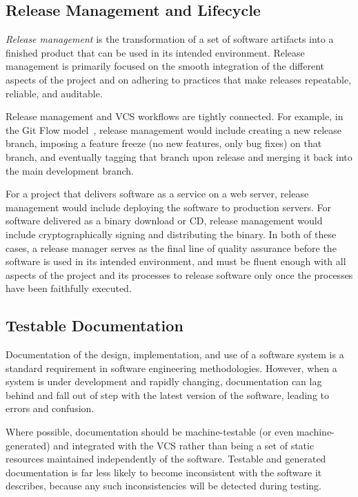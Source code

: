 \subsection{Release Management and Lifecycle}

\emph{Release management} is the transformation of a set of software
artifacts into a finished product that can be used in its intended
environment. Release management is primarily focused on the smooth
integration of the different aspects of the project and on adhering to
practices that make releases repeatable, reliable, and auditable.

Release management and VCS workflows are tightly connected. For
example, in the Git Flow model~\cite{atlassianworkflow}, release
management would include creating a new release branch, imposing a
feature freeze (no new features, only bug fixes) on that branch, and
eventually tagging that branch upon release and merging it back into
the main development branch.

For a project that delivers software as a service on a web server,
release management would include deploying the software to production
servers. For software delivered as a binary download or CD, release
management would include cryptographically signing and distributing
the binary. In both of these cases, a release manager serves as the
final line of quality assurance before the software is used in its
intended environment, and must be fluent enough with all aspects of
the project and its processes to release software only once the
processes have been faithfully executed.

\subsection{Testable Documentation}

Documentation of the design, implementation, and use of a software
system is a standard requirement in software engineering
methodologies. However, when a system is under development and rapidly
changing, documentation can lag behind and fall out of step with the
latest version of the software, leading to errors and confusion.

Where possible, documentation should be machine-testable (or even
machine-generated) and integrated with the VCS rather than being a set
of static resources maintained independently of the software. Testable
and generated documentation is far less likely to become inconsistent with
the software it describes, because any such inconsistencies will be
detected during testing.

